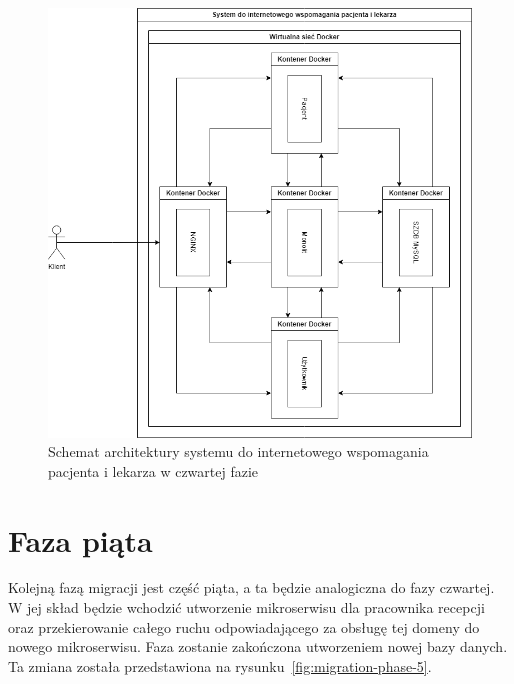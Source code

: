 \documentclass[12pt,oneside]{book}
\newcommand{\captionvspace}{\vspace{6pt}}
\begin{document}
    \begin{figure}[ht]
        \centering
        \includegraphics[width=\textwidth]{includes/images/migration-phase-4.png}
        \captionvspace
        \caption{Schemat architektury systemu do internetowego wspomagania pacjenta i lekarza w czwartej fazie}
        \label{fig:migration-phase-4}
    \end{figure}


    \section{Faza piąta}
    Kolejną fazą migracji jest część piąta, a ta będzie analogiczna do fazy czwartej. W jej skład będzie wchodzić utworzenie mikroserwisu dla pracownika recepcji oraz przekierowanie całego ruchu odpowiadającego za obsługę tej domeny do nowego mikroserwisu. Faza zostanie zakończona utworzeniem nowej bazy danych. Ta zmiana została przedstawiona na rysunku~\ref{fig:migration-phase-5}.
\end{document}
